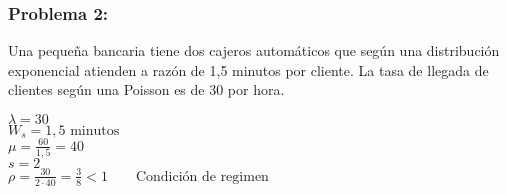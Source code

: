 \documentclass{templateNote}
\begin{document}
\subsubsection{Problema 2:}
Una peque\~na bancaria tiene dos cajeros autom\'aticos que seg\'un una distribuci\'on exponencial atienden a raz\'on de 1,5 minutos por cliente. La tasa de llegada de clientes seg\'un una Poisson es de 30 por hora.
\begin{tcolorbox}[
    colframe=Celeste!100, %
    colback=Celeste!20,       %
    coltitle=white!100, %
    title=\textbf{Datos}, %
]
    $\lambda = 30$ \\
    $W_s = 1,5 \text{ minutos}$ \\
    $\mu = \frac{60}{1,5} = 40$ \\
    $s = 2$ \\
    $\rho = \frac{30}{2 \cdot 40} = \frac{3}{8} < 1 \qquad \text{Condici\'on de regimen}$
\end{tcolorbox}
\end{document}
